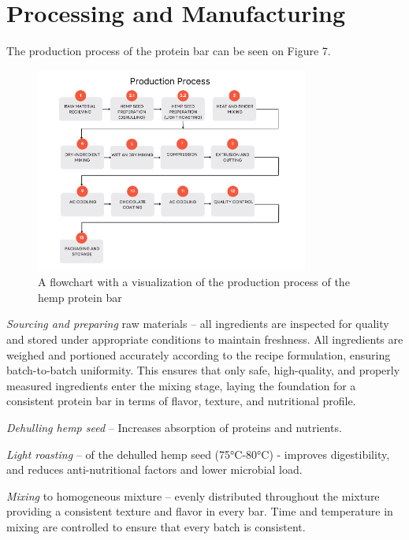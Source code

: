 \chapter{Processing and Manufacturing}
\setlength{\headheight}{12.71342pt}
\addtolength{\topmargin}{-0.71342pt}

The production process of the protein bar can be seen on Figure 7.
\begin{figure}[H]
    \centering
    \includegraphics[width=0.8\textwidth]{Figures/fig_process_01.png}
    \caption{A flowchart with a visualization of the production process of the hemp protein bar}
    \label{fig:process_flow_diagram}
\end{figure}

\textit{Sourcing and preparing} raw materials – all ingredients are inspected for quality and stored under appropriate conditions to maintain freshness. All ingredients are weighed and portioned accurately according to the recipe formulation, ensuring batch-to-batch uniformity. This ensures that only safe, high-quality, and properly measured ingredients enter the mixing stage, laying the foundation for a consistent protein bar in terms of flavor, texture, and nutritional profile.

\vspace{1em}
\textit{Dehulling hemp seed} – Increases absorption of proteins and nutrients.

\vspace{1em}
\textit{Light roasting} – of the dehulled hemp seed (75°C-80°C) - improves digestibility, and reduces anti-nutritional factors and lower microbial load.

\vspace{1em}
\textit{Mixing} to homogeneous mixture – evenly distributed throughout the mixture providing a consistent texture and flavor in every bar. Time and temperature in mixing are controlled to ensure that every batch is consistent.

